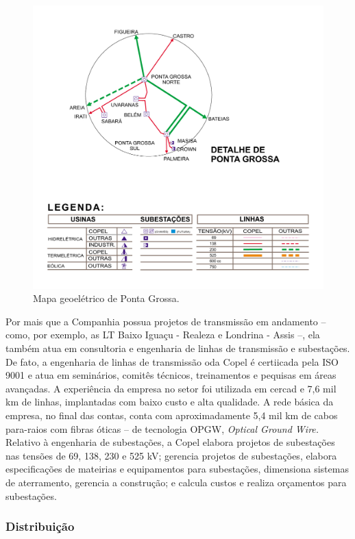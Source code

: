 \documentclass[grad,numbers]{coppe}
\begin{document}
  \begin{figure}[H]
  \includegraphics[width=1\linewidth]{img/mapa_geoeletrico_ponta_grossa} \caption{Mapa geoelétrico de Ponta Grossa.}\label{fig:unnamed-chunk-8}
  \end{figure}
  Por mais que a Companhia possua projetos de transmissão em andamento -- como, por exemplo, as LT Baixo Iguaçu - Realeza e Londrina - Assis --, ela também atua em consultoria e engenharia de linhas de transmissão e subestações. De fato, a engenharia de linhas de transmissão oda Copel é certiicada pela ISO 9001 e atua em seminários, comitês técnicos, treinamentos e pequisas em áreas avançadas. A experiência da empresa no setor foi utilizada em cercad e 7,6 mil km de linhas, implantadas com baixo custo e alta qualidade. A rede básica da empresa, no final das contas, conta com aproximadamente 5,4 mil km de cabos para-raios com fibras óticas -- de tecnologia OPGW, \emph{Optical Ground Wire.} Relativo à engenharia de subestações, a Copel elabora projetos de subestações nas tensões de 69, 138, 230 e 525 kV; gerencia projetos de subestações, elabora especificações de mateirias e equipamentos para subestações, dimensiona sistemas de aterramento, gerencia a construção; e calcula custos e realiza orçamentos para subestações.

  \hypertarget{distribuiuxe7uxe3o}{%
  \subsubsection{Distribuição}\label{distribuiuxe7uxe3o}}
\end{document}
